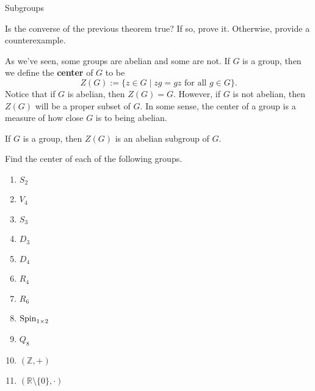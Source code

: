 \begin{section}{Subgroups}
\begin{problem}
Is the converse of the previous theorem true?  If so, prove it.  Otherwise, provide a counterexample.
\end{problem}

As we've seen, some groups are abelian and some are not.  If $G$ is a group, then we define the \textbf{center} of $G$ to be
\[
Z(G):=\{z\in G\mid zg=gz\text{ for all } g\in G\}.
\]
Notice that if $G$ is abelian, then $Z(G)=G$.  However, if $G$ is not abelian, then $Z(G)$ will be a proper subset of $G$.  In some sense, the center of a group is a measure of how close $G$ is to being abelian.

\begin{theorem}
If $G$ is a group, then $Z(G)$ is an abelian subgroup of $G$.
\end{theorem}

\begin{problem}
Find the center of each of the following groups.
\begin{enumerate}[label=\textrm{(\alph*)}]
\item $S_2$
\item $V_4$
\item $S_3$
\item $D_3$
\item $D_4$
\item $R_4$
\item $R_6$
\item $\operatorname{Spin}_{1\times 2}$
\item $Q_8$
\item $(\mathbb{Z},+)$
\item $(\mathbb{R}\setminus\{0\},\cdot)$
\end{enumerate}
\end{problem}

\end{section}


